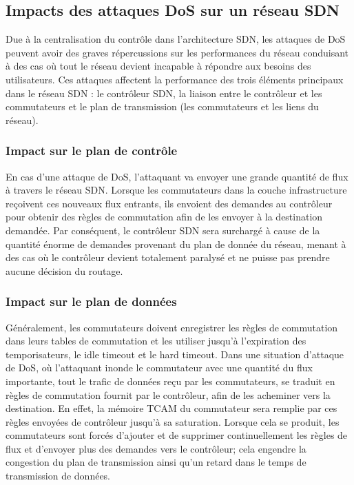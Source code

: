 \subsection{Impacts des attaques DoS sur un réseau SDN}
Due à la centralisation du contrôle dans l’architecture SDN, les attaques de DoS peuvent avoir des graves répercussions sur les performances du réseau conduisant à des cas où tout le réseau devient incapable à répondre aux besoins des utilisateurs. Ces attaques affectent la performance des trois éléments principaux dans le réseau SDN : le contrôleur SDN, la liaison entre le contrôleur et les commutateurs et le plan de transmission (les commutateurs et les liens du réseau).

\subsubsection{Impact sur le plan de contrôle}
En cas d’une attaque de DoS, l’attaquant va envoyer une grande quantité de flux à travers le réseau SDN. Lorsque les commutateurs dans la couche infrastructure reçoivent ces nouveaux flux entrants, ils envoient des demandes au contrôleur pour obtenir des règles de commutation afin de les envoyer à la destination demandée. Par conséquent, le contrôleur SDN sera surchargé à cause de la quantité énorme de demandes provenant du plan de donnée du réseau, menant à des cas où le contrôleur devient totalement paralysé et ne puisse pas prendre aucune décision du routage.

\subsubsection{Impact sur le plan de données}
Généralement, les commutateurs doivent enregistrer les règles de commutation dans leurs tables de commutation et les utiliser jusqu’à l’expiration des temporisateurs, le idle timeout et le hard timeout. Dans une situation d’attaque de DoS, où l’attaquant inonde le commutateur avec une quantité du flux importante, tout le trafic de données reçu par les commutateurs, se traduit en règles de commutation fournit par le contrôleur, afin de les acheminer vers la destination. En effet, la mémoire TCAM du commutateur sera remplie par ces règles envoyées de contrôleur jusqu’à sa saturation. Lorsque cela se produit, les commutateurs sont forcés d’ajouter et de supprimer continuellement les règles de flux et d’envoyer plus des demandes vers le contrôleur; cela engendre la congestion du plan de transmission ainsi qu’un retard dans le temps de transmission de données.


